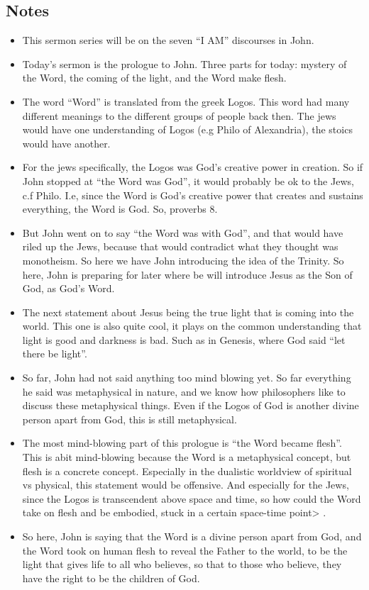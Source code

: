 \subsection*{Notes}
\begin{itemize}
  \item{This sermon series will be on the seven “I AM” discourses in John.}
  \item{Today’s sermon is the prologue to John. Three parts for today: mystery of the Word, the coming of the light, and the Word make flesh.}
  \item{The word “Word” is translated from the greek Logos. This word had many different meanings to the different groups of people back then. The jews would have one understanding of Logos (e.g Philo of Alexandria), the stoics would have another.}
  \item{For the jews specifically, the Logos was God’s creative power in creation. So if John stopped at “the Word was God”, it would probably be ok to the Jews, c.f Philo. I.e, since the Word is God’s creative power that creates and sustains everything, the Word is God. So, proverbs 8.}
  \item{But John went on to say “the Word was with God”, and that would have riled up the Jews, because that would contradict what they thought was monotheism. So here we have John introducing the idea of the Trinity. So here, John is preparing for later where be will introduce Jesus as the Son of God, as God’s Word. }
  \item{The next statement about Jesus being the true light that is coming into the world. This one is also quite cool, it plays on the common understanding that light is good and darkness is bad. Such as in Genesis, where God said “let there be light”.}
  \item{So far, John had not said anything too mind blowing yet. So far everything he said was metaphysical in nature, and we know how philosophers like to discuss these metaphysical things. Even if the Logos of God is another divine person apart from God, this is still metaphysical.}
  \item{The most mind-blowing part of this prologue is “the Word became flesh”. This is abit mind-blowing because the Word is a metaphysical concept, but flesh is a concrete concept. Especially in the dualistic worldview of spiritual vs physical, this statement would be offensive. And especially for the Jews, since the Logos is transcendent above space and time, so how could the Word take on flesh and be embodied, stuck in a certain space-time point> .}
  \item{So here, John is saying that the Word is a divine person apart from God, and the Word took on human flesh to reveal the Father to the world, to be the light that gives life to all who believes, so that to those who believe, they have the right to be the children of God. }
\end{itemize}